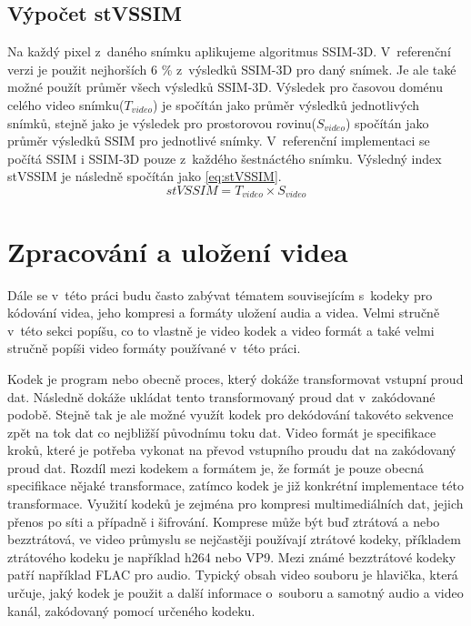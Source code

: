 \documentclass[thesis=M,czech]{FITthesis}[2016/06/26]
\begin{document}
\subsection{Výpočet stVSSIM}
Na každý pixel z~daného snímku aplikujeme algoritmus SSIM-3D. V~referenční verzi je použit nejhorších 6 \% z~výsledků SSIM-3D pro daný snímek. Je ale také možné použít průměr všech výsledků SSIM-3D. Výsledek pro časovou doménu celého video snímku($T_{video}$) je spočítán jako průměr výsledků jednotlivých snímků, stejně jako je výsledek pro prostorovou rovinu($S_{video}$) spočítán jako průměr výsledků SSIM pro jednotlivé snímky. V~referenční implementaci \cite{stVSSIM} se počítá SSIM i SSIM-3D pouze z~každého šestnáctého snímku. Výsledný index stVSSIM je následně spočítán jako \ref{eq:stVSSIM}.
\begin{equation} \label{eq:stVSSIM}
\mathit{stVSSIM} = T_{video}\times S_{video}
\end{equation}


\section{Zpracování a uložení videa}
Dále se v~této práci budu často zabývat tématem souvisejícím s~kodeky pro kódování videa, jeho kompresi a formáty uložení audia a videa. Velmi stručně v~této sekci popíšu, co to vlastně je video kodek a video formát a také velmi stručně popíši video formáty používané v~této práci.

Kodek je program nebo obecně proces, který dokáže transformovat vstupní proud dat. Následně dokáže ukládat tento transformovaný proud dat v~zakódované podobě. Stejně tak je ale možné využít kodek pro dekódování takovéto sekvence zpět na tok dat co nejbližší původnímu toku dat. Video formát je specifikace kroků, které je potřeba vykonat na převod vstupního proudu dat na zakódovaný proud dat. Rozdíl mezi kodekem a formátem je, že formát je pouze obecná specifikace nějaké transformace, zatímco kodek je již konkrétní implementace této transformace. Využití kodeků je zejména pro kompresi multimediálních dat, jejich přenos po síti a případně i šifrování. Komprese může být buď ztrátová a nebo bezztrátová, ve video průmyslu se nejčastěji používají ztrátové kodeky, příkladem ztrátového kodeku je například h264 nebo VP9. Mezi známé bezztrátové kodeky patří například FLAC pro audio. Typický obsah video souboru je hlavička, která určuje, jaký kodek je použit a další informace o~souboru a samotný audio a video kanál, zakódovaný pomocí určeného kodeku.
\end{document}
